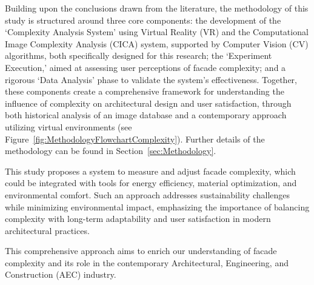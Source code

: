 Building upon the conclusions drawn from the literature, the methodology of this study is structured around three core components: the development of the `Complexity Analysis System' using Virtual Reality (VR) and the Computational Image Complexity Analysis (CICA) system, supported by Computer Vision (CV) algorithms, both specifically designed for this research; the `Experiment Execution,' aimed at assessing user perceptions of facade complexity; and a rigorous `Data Analysis' phase to validate the system's effectiveness.
Together, these components create a comprehensive framework for understanding the influence of complexity on architectural design and user satisfaction, through both historical analysis of an image database and a contemporary approach utilizing virtual environments (see Figure~\ref{fig:MethodologyFlowchartComplexity}).
Further details of the methodology can be found in Section~\ref{sec:Methodology}.


This study proposes a system to measure and adjust facade complexity, which could be integrated with tools for energy efficiency, material optimization, and environmental comfort.
Such an approach addresses sustainability challenges while minimizing environmental impact, emphasizing the importance of balancing complexity with long-term adaptability and user satisfaction in modern architectural practices.

This comprehensive approach aims to enrich our understanding of facade complexity and its role in the contemporary Architectural, Engineering, and Construction (AEC) industry.


